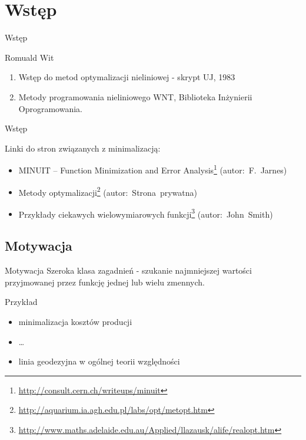 \section{Wstęp}

  \begin{frame}{Wstęp}
    \begin{block}{Romuald Wit}
      \begin{enumerate}
        \item Wstęp do metod optymalizacji nieliniowej - skrypt
        UJ, 1983
        \item Metody programowania nieliniowego WNT, Biblioteka
        Inżynierii Oprogramowania.
      \end{enumerate}
    \end{block}
  \end{frame}

  \begin{frame}{Wstęp}
    \begin{block}{Linki do stron związanych z minimalizacją:}
      \begin{itemize}
        \item MINUIT -- Function Minimization and Error
        Analysis\footnote{\url{http://consult.cern.ch/writeups/minuit}}
        (autor:~F.~Jarnes)
        \item Metody optymalizacji\footnote{\url{http://aquarium.ia.agh.edu.pl/labs/opt/metopt.htm}}
        (autor:~Strona~prywatna)
        \item Przykłady ciekawych wielowymiarowych
        funkcji\footnote{\url{http://www.maths.adelaide.edu.au/Applied/llazausk/alife/realopt.htm}}
        (autor:~John~Smith)
      \end{itemize}
    \end{block}
  \end{frame}

\subsection{Motywacja}

  \begin{frame}{Motywacja}
    Szeroka klasa zagadnień - szukanie najmniejszej wartości
    przyjmowanej przez funkcję jednej lub wielu zmennych.

    \begin{exampleblock}{Przykład}
      \begin{itemize}
        \item minimalizacja kosztów producji
        \item \ldots
        \item linia geodezyjna w ogólnej teorii względności
      \end{itemize}
    \end{exampleblock}
  \end{frame}

